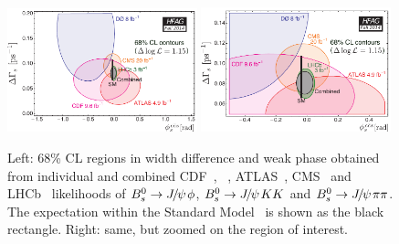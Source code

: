 \begin{figure}
\begin{center}
\includegraphics[width=0.49\textwidth]{figures/life_mix/hfag_Fall2014_DGsphis}
\includegraphics[width=0.49\textwidth]{figures/life_mix/hfag_Fall2014_DGsphis_zoom}
\caption{
Left: 68\% CL regions in \Bs width difference \DGs and weak phase \phiccbars
obtained from individual and combined CDF~\cite{Aaltonen:2012ie,*CDF:2011af,*Aaltonen:2007he_mod,*Aaltonen:2007gf_mod},
\dzero~\cite{Abazov:2011ry,*Abazov_mod:2008fj,*Abazov:2007tx_mod_cont}, ATLAS~\cite{Aad:2014cqa,*Aad:2012kba_cont}, 
CMS~\cite{CMS-PAS-BPH-13-012}
and LHCb~\cite{LHCB-PAPER-2014-059,*Aaij:2013oba_supersede2,Aaij:2014dka,*Aaij:2013oba_supersede}
likelihoods of 
$B^0_s\to {J\mskip -3mu/\mskip -2mu\psi\mskip 2mu}\phi$, $B^0_s\to {J\mskip -3mu/\mskip -2mu\psi\mskip 2mu} KK$ and $B^0_s\to{J\mskip -3mu/\mskip -2mu\psi\mskip 2mu}\pi\pi$. 
The expectation within the Standard Model~\cite{Charles:2011va_mod,Lenz:2011ti,*Lenz:2006hd}
is shown as the black rectangle.
Right: same, but zoomed on the region of interest.
}
\end{center}
\end{figure}

